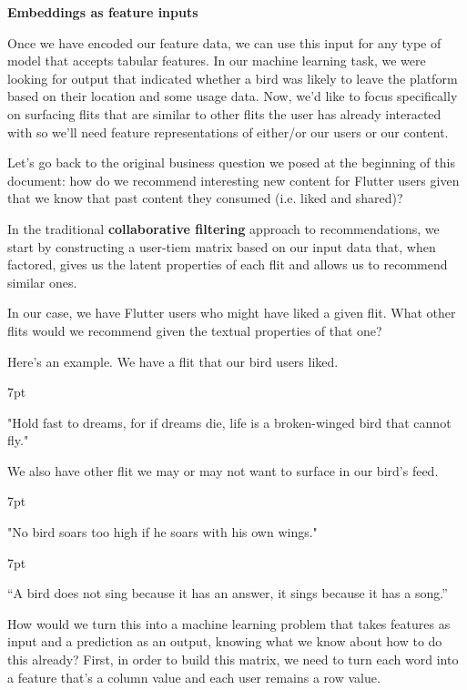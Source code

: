 \documentclass[11pt, table]{diazessay} %
\newenvironment{formal}{%
  \def\FrameCommand{%
    \hspace{1pt}%
    {\color{w_lightblue}\vrule width 2pt}%
    {\color{formalshade}\vrule width 4pt}%
    \colorbox{formalshade}%
  }%
  \MakeFramed{\advance\hsize-\width\FrameRestore}%
  \noindent\hspace{-4.55pt}%
  \begin{adjustwidth}{}{7pt}%
  \vspace{2pt}\vspace{2pt}%
}
{%
  \vspace{2pt}\end{adjustwidth}\endMakeFramed%
}
\begin{document}
\begin{sloppypar}
\textbf{Embeddings as feature inputs}

Once we have encoded our feature data, we can use this input for any type of model that accepts tabular features.  In our machine learning task, we were looking for output that indicated whether a bird was likely to leave the platform based on their location and some usage data. Now, we'd like to focus specifically on surfacing flits that are similar to other flits the user has already interacted with so we'll need feature representations of either/or our users or our content. 

Let's go back to the original business question we posed at the beginning of this document: how do we recommend interesting new content for Flutter users given that we know that past content they consumed (i.e. liked and shared)?

In the traditional \textbf{collaborative filtering} approach to recommendations, we start by constructing a user-tiem matrix based on our input data that, when factored, gives us the latent properties of each flit and allows us to recommend similar ones. 

In our case, we have Flutter users who might have liked a given flit. What other flits would we recommend given the textual properties of that one? 

Here’s an example.  We have a flit that our bird users liked. 

\begin{formal}
    "Hold fast to dreams, for if dreams die, life is a broken-winged bird that cannot fly."
\end{formal}

We also have other flit we may or may not want to surface in our bird's feed. 

\begin{formal}
"No bird soars too high if he soars with his own wings."
\end{formal}

\begin{formal}
“A bird does not sing because it has an answer, it sings because it has a song.” 
\end{formal}

How would we turn this into a machine learning problem that takes features as input and a prediction as an output, knowing what we know about how to do this already?  First, in order to build this matrix, we need to turn each word into a feature that's a column value and each user remains a row value. 



\end{sloppypar}
\end{document}
